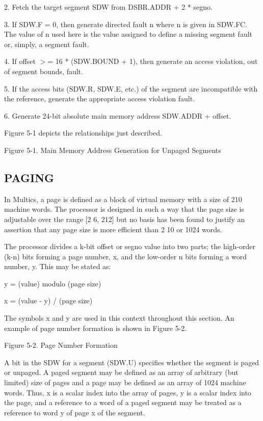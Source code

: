 2. Fetch the target segment SDW from DSBR.ADDR + 2 * segno.


3. If SDW.F = 0, then generate directed fault n where n is given in SDW.FC. The
value of n used here is the value assigned to define a missing segment fault
or, simply, a segment fault.


4. If offset $>$= 16 * (SDW.BOUND + 1), then generate an access violation, out
of segment bounds, fault.


5. If the access bits (SDW.R, SDW.E, etc.) of the segment are incompatible with
the reference, generate the appropriate access violation fault.


6. Generate 24-bit absolute main memory address SDW.ADDR + offset.


Figure 5-1 depicts the relationships just described.


Figure 5-1. Main Memory Address Generation for Unpaged Segments


\subsection{PAGING}

In Multics, a page is defined as a block of virtual memory with a size of 210
machine words.  The processor is designed in such a way that the page size is
adjustable over the range [2 6, 212] but no basis has been found to justify an
assertion that any page size is more efficient than 2 10 or 1024 words.


The processor divides a k-bit offset or segno value into two parts; the
high-order (k-n) bits forming a page number, x, and the low-order n bits
forming a word number, y. This may be stated as:


y = (value) modulo (page size)

x = (value - y) / (page size)


The symbols x and y are used in this context throughout this section. An example of page number formation is shown in Figure 5-2.

Figure 5-2. Page Number Formation


A bit in the SDW for a segment (SDW.U) specifies whether the segment is paged
or unpaged. A paged segment may be defined as an array of arbitrary (but
limited) size of pages and a page may be defined as an array of 1024 machine
words. Thus, x is a scalar index into the array of pages, y is a scalar index
into the page, and a reference to a word of a paged segment may be treated as a
reference to word y of page x of the segment.


